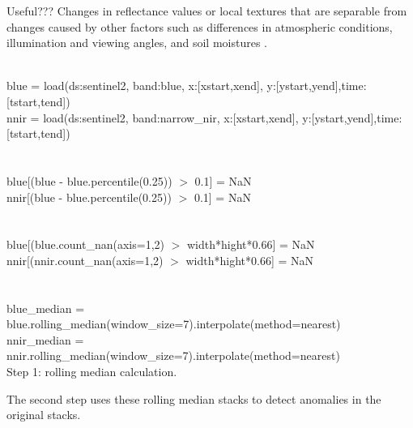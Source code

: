 \documentclass[essd, manuscript]{copernicus}
\begin{document}
Useful??? Changes in reflectance values or local textures that are separable from changes caused by other factors such as differences in atmospheric conditions, illumination and viewing angles, and soil moistures \citep{deng2008pca}.

\begin{algorithm}[H]
\SetAlgoLined
 \\
 blue = load(ds:sentinel2, band:blue, x:[xstart,xend], y:[ystart,yend],time:[tstart,tend])\\
 nnir = load(ds:sentinel2, band:narrow\_nir, x:[xstart,xend], y:[ystart,yend],time:[tstart,tend])\\
 \\
 \\
 blue[(blue - blue.percentile(0.25)) $>$ 0.1] = NaN\\
 nnir[(blue - blue.percentile(0.25)) $>$ 0.1] = NaN\\
 \\
 \\
 blue[(blue.count\_nan(axis=1,2) $>$ width*hight*0.66] = NaN\\
 nnir[(nnir.count\_nan(axis=1,2) $>$ width*hight*0.66] = NaN\\
 \\
 \\
 blue\_median = blue.rolling\_median(window\_size=7).interpolate(method=nearest)\\
 nnir\_median = nnir.rolling\_median(window\_size=7).interpolate(method=nearest)\\
 \caption{Step 1: rolling median calculation.}
\end{algorithm}

The second step uses these rolling median stacks to detect anomalies in the original stacks. 
\end{document}
